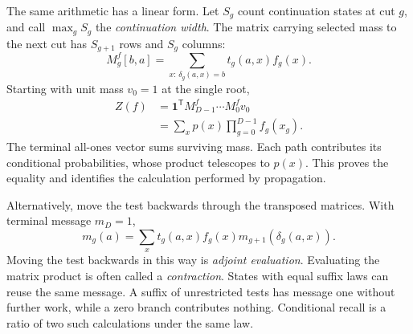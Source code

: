 \documentclass[reprint,aps,prx,superscriptaddress,nofootinbib,longbibliography]{revtex4-2}
\begin{document}
The same arithmetic has a linear form.
Let \(S_g\) count continuation states at cut \(g\), and call \(\max_g S_g\) the \emph{continuation width}.
The matrix carrying selected mass to the next cut has \(S_{g+1}\) rows and \(S_g\) columns:
\begin{equation}
 M_g^f[b,a]=\sum_{x:\,\delta_g(a,x)=b}t_g(a,x)f_g(x).
 \label{eq:querymatrix}
\end{equation}
Starting with unit mass \(v_0=1\) at the single root,
\begin{equation}
 \begin{aligned}
 Z(f)&=\mathbf1^{\mathsf T}M_{D-1}^f\cdots M_0^fv_0\\
     &=\sum_xp(x)\prod_{g=0}^{D-1}f_g(x_g).
 \end{aligned}
 \label{eq:querymass}
\end{equation}
The terminal all-ones vector sums surviving mass.
Each path contributes its conditional probabilities, whose product telescopes to \(p(x)\).
This proves the equality and identifies the calculation performed by propagation.

Alternatively, move the test backwards through the transposed matrices.
With terminal message \(m_D=1\),
\begin{equation}
 m_g(a)=\sum_x t_g(a,x)f_g(x)
              m_{g+1}\!\left(\delta_g(a,x)\right).
 \label{eq:adjoint}
\end{equation}
Moving the test backwards in this way is \emph{adjoint evaluation}.
Evaluating the matrix product is often called a \emph{contraction}.
States with equal suffix laws can reuse the same message.
A suffix of unrestricted tests has message one without further work, while a zero branch contributes nothing.
Conditional recall is a ratio of two such calculations under the same law.
\end{document}
